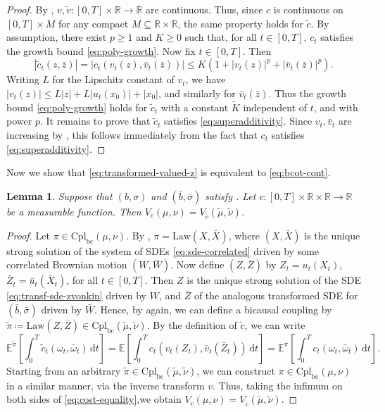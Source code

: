 \documentclass[onseside, final]{amsart}
\newtheorem{lemma}[theorem]{Lemma}
\theoremstyle{definition}
\newcommand{\R}{\mathbb R}
\newcommand{\E}{\mathbb E}
\newcommand{\Law}{\mathrm{Law}}
\newcommand{\D}{\,\mathrm{d}}
\newcommand{\cpl}{\mathrm{Cpl}}
\newcommand{\cplba}{\cpl_{\mathrm{bc}}}
\numberwithin{equation}{section}
\begin{document}
	\begin{proof}
		By , $v, \tilde v \colon [0, T] \times \R \to \R$ are continuous. Thus, since $c$ is continuous on $[0, T] \times M$ for any compact $M \subseteq \R \times \R$, the same property holds for $\tilde c$.
		By assumption, there exist $p \geq 1$ and $K \geq 0$ such that, for all $t \in [0, T]$, $c_t$ satisfies the growth bound \eqref{eq:poly-growth}. Now fix $t \in [0, T]$. Then
		\begin{equation}
			|\tilde c_t(z, \bar z)| = |c_t(v_t(z), \bar v_t(\bar z))| \leq K(1 + |v_t(z)|^p + |\bar v_t(\bar z)|^p).
		\end{equation}
		Writing $L$ for the Lipschitz constant of $v_t$, we have $|v_t(z)| \leq L|z| + L|u_t(x_0)| + |x_0|$, and similarly for $\bar v_t(\bar z)$. Thus the growth bound \eqref{eq:poly-growth} holds for $\tilde c_t$ with a constant $\tilde K$ independent of $t$, and with power $p$. It remains to prove that $\tilde c_t$ satisfies \eqref{eq:superadditivity}. Since $v_t, \bar v_t$ are increasing by , this follows immediately from the fact that $c_t$ satisfies \eqref{eq:superadditivity}.
	\end{proof}
	
	Now we show that \eqref{eq:transformed-valued-z} is equivalent to \eqref{eq:bcot-cont}.
	
	\begin{lemma}\label{lem:z-transformed-value}
		Suppose that $(b, \sigma)$ and $(\bar b, \bar \sigma)$ satisfy . Let $c \colon [0, T] \times \R \times \R \to \R$ be a measurable function. Then $V_c(\mu, \nu) = V_{\tilde c}(\tilde\mu, \tilde\nu)$.
	\end{lemma}
	
	\begin{proof}
		Let $\pi \in \cplba(\mu, \nu)$. By \citep[Proposition 2.2]{BaKaRo22}, $\pi = \Law(X, \bar X)$, where $(X, \bar X)$ is the unique strong solution of the system of SDEs \eqref{eq:sde-correlated} driven by some correlated Brownian motion $(W, \bar W)$. Now define $(Z, \bar Z)$ by $Z_t = u_t(X_t)$, $\bar Z_t = \bar u_t(\bar X_t)$, for all $t \in [0, T]$. Then $Z$ is the unique strong solution of the SDE \eqref{eq:transf-sde-zvonkin} driven by $W$, and $\bar Z$ of the analogous transformed SDE for $(\bar b, \bar \sigma)$ driven by $\bar W$. Hence, by \citep[Proposition 2.2]{BaKaRo22} again, we can define a bicausal coupling by $\tilde \pi \coloneqq \Law(Z, \bar Z) \in \cplba(\tilde \mu, \tilde \nu)$. By the definition of $\tilde c$, we can write
		\begin{equation}\label{eq:cost-equality}
			 \E^{\tilde\pi}\!\left[\int_0^T \tilde c_t(\omega_t, \bar \omega_t) \D t\right]\! = \E\!\left[\int_0^T c_t(v_t(Z_t), \bar v_t(\bar Z_t)) \D t\right]\! = \E^\pi\!\left[\int_0^T c_t(\omega_t, \bar \omega_t) \D t\right]\!.
		\end{equation}
		Starting from an arbitrary $\tilde \pi \in \cplba(\tilde \mu, \tilde \nu)$, we can construct $\pi \in \cplba(\mu, \nu)$ in a similar manner, via the inverse transform $v$. Thus, taking the infimum on both sides of \eqref{eq:cost-equality},we obtain $V_c(\mu, \nu) = V_{\tilde c}(\tilde \mu, \tilde \nu)$.
	\end{proof}
	
\end{document}
